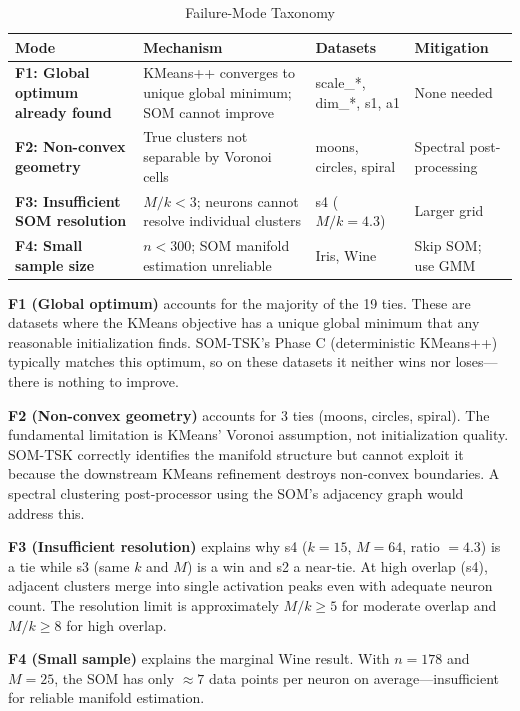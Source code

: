 \documentclass[journal]{IEEEtran}
\begin{document}
\begin{table}[!t]
\caption{Failure-Mode Taxonomy}
\label{tab:failure_modes}
\centering
\renewcommand{\arraystretch}{1.1}
\small
\setlength{\tabcolsep}{2.5pt}
\begin{tabular}{p{1.8cm}p{2.5cm}p{1.8cm}p{1.5cm}}
\toprule
Mode & Mechanism & Datasets & Mitigation \\
\midrule
\textbf{F1: Global optimum already found} & KMeans++ converges to unique global minimum; SOM cannot improve & scale\_*, dim\_*, s1, a1 & None needed \\
\midrule
\textbf{F2: Non-convex geometry} & True clusters not separable by Voronoi cells & moons, circles, spiral & Spectral post-processing \\
\midrule
\textbf{F3: Insufficient SOM resolution} & $M/k < 3$; neurons cannot resolve individual clusters & s4 ($M/k=4.3$) & Larger grid \\
\midrule
\textbf{F4: Small sample size} & $n < 300$; SOM manifold estimation unreliable & Iris, Wine & Skip SOM; use GMM \\
\bottomrule
\end{tabular}
\end{table}

\textbf{F1 (Global optimum)} accounts for the majority of the 19 ties. These are datasets where the KMeans objective has a unique global minimum that any reasonable initialization finds. SOM-TSK's Phase C (deterministic KMeans++) typically matches this optimum, so on these datasets it neither wins nor loses---there is nothing to improve.

\textbf{F2 (Non-convex geometry)} accounts for 3 ties (moons, circles, spiral). The fundamental limitation is KMeans' Voronoi assumption, not initialization quality. SOM-TSK correctly identifies the manifold structure but cannot exploit it because the downstream KMeans refinement destroys non-convex boundaries. A spectral clustering post-processor using the SOM's adjacency graph would address this.

\textbf{F3 (Insufficient resolution)} explains why s4 ($k=15$, $M=64$, ratio $= 4.3$) is a tie while s3 (same $k$ and $M$) is a win and s2 a near-tie. At high overlap (s4), adjacent clusters merge into single activation peaks even with adequate neuron count. The resolution limit is approximately $M/k \ge 5$ for moderate overlap and $M/k \ge 8$ for high overlap.

\textbf{F4 (Small sample)} explains the marginal Wine result. With $n=178$ and $M=25$, the SOM has only $\approx 7$ data points per neuron on average---insufficient for reliable manifold estimation.
\end{document}
